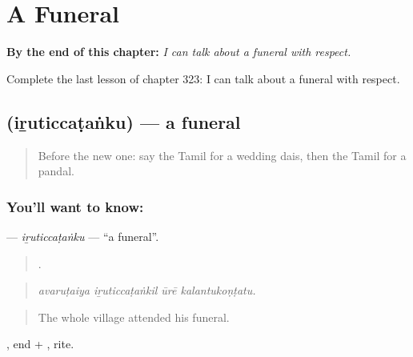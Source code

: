 
\chapter{A Funeral}
\label{ch:ta-a-funeral}

\begin{chapteropening}
\textbf{By the end of this chapter:} \emph{I can talk about a funeral with respect.}

Complete the last lesson of chapter 323: I can talk about a funeral with respect.
\end{chapteropening}

\section[\texorpdfstring{\ta{இறுதிச்சடங்கு} (iṟuticcaṭaṅku)}{இறுதிச்சடங்கு (iṟuticcaṭaṅku)}]{ (iṟuticcaṭaṅku) — a funeral}

\label{lesson:TA-C323-iruticcatanku}



\begin{quote}
Before the new one: say the Tamil for a wedding dais, then the Tamil for a pandal.
\end{quote}

\subsection*{You'll want to know: }
\textbf{} — \emph{iṟuticcaṭaṅku} — \textquotedblleft{}a funeral\textquotedblright{}.

\begin{quote}
   .
\end{quote}

\begin{quote}
\emph{avaruṭaiya iṟuticcaṭaṅkil ūrē kalantukoṇṭatu.}
\end{quote}

\begin{quote}
The whole village attended his funeral.
\end{quote}

, end + , rite.


